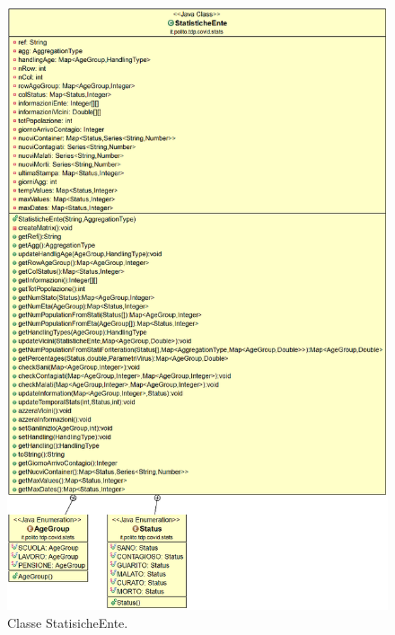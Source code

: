 \documentclass[a4paper, 12pt]{article}
\begin{document}
		\begin{figure}[H]
			\centering
			\includegraphics[width=\linewidth]{IMG/stats.png}
			\caption[UML statistiche]{Classe StatisicheEnte.}
			\label{fig:UMLstats}
		\end{figure}
\end{document}
